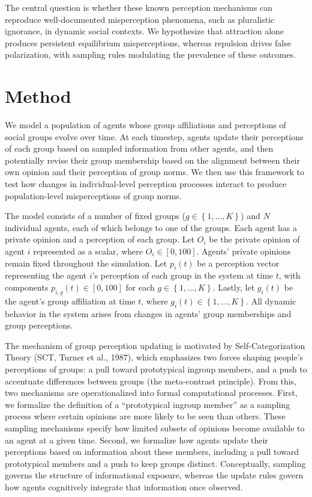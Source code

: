 The central question is whether these known perception mechanisms can reproduce well\hyp{}documented misperception phenomena, such as pluralistic ignorance, in dynamic social contexts. We hypothesize that attraction alone produces persistent equilibrium misperceptions, whereas repulsion drives false polarization, with sampling rules modulating the prevalence of these outcomes.


\section{Method}

We model a population of agents whose group affiliations and perceptions of social groups evolve over time. At each timestep, agents update their perceptions of each group based on sampled information from other agents, and then potentially revise their group membership based on the alignment between their own opinion and their perception of group norms. We then use this framework to test how changes in individual-level perception processes interact to produce population-level misperceptions of group norms.

The model consists of a number of fixed groups ($g \in \left\{ 1, \dots, K \right\}$) and $N$ individual agents, each of which belongs to one of the groups. Each agent has a private opinion and a perception of each group. Let $O_i$ be the private opinion of agent $i$ represented as a scalar, where $O_i \in [0,100]$. Agents' private opinions remain fixed throughout the simulation. 
Let $p_i(t)$ be a perception vector representing the agent $i$'s perception of each group in the system at time $t$, with components $p_{i,g}(t) \in [0,100]$ for each $g \in \left\{ 1, \dots, K \right\}$. Lastly, let $g_i(t)$ be the agent's group affiliation at time $t$, where $g_i(t) \in \left\{ 1 , \dots , K \right\}$. All dynamic behavior in the system arises from changes in agents' group memberships and group perceptions. 

The mechanism of group perception updating is motivated by Self-Categorization Theory (SCT, Turner et al., 1987), which emphasizes two forces shaping people's perceptions of groups: a pull toward prototypical ingroup members, and a push to accentuate differences between groups (the meta-contrast principle). From this, two mechanisms are operationalized into formal computational processes. First, we formalize the definition of a ``prototypical ingroup member'' as a sampling process where certain opinions are more likely to be seen than others. These sampling mechanisms specify how limited subsets of opinions become available to an agent at a given time. Second, we formalize how agents update their perceptions based on information about these members, including a pull toward prototypical members and a push to keep groups distinct. Conceptually, sampling governs the structure of informational exposure, whereas the update rules govern how agents cognitively integrate that information once observed.

